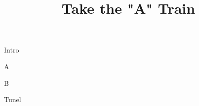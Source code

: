 \documentclass[timestamp]{jazzgrid}
\title{Take the "A" Train}
\begin{document}
\maketitle
\begin{musicsection}{Intro}
\barline
	{\barfour{}
		{}
		{}
		{}
		{}
	}
	{\barfour{}
		{}
		{}
		{}
		{}
	}
	{\barfour{}
		{}
		{}
		{}
		{}
	}
	{\barfour{}
		{}
		{}
		{}
		{}
	}
\end{musicsection}
\begin{musicsection}{A}
\barline
	{\barfour{}
		{}
		{}
		{}
		{}
	}
	{\barfour{}
		{}
		{}
		{}
		{}
	}
	{\barfour{}
		{}
		{}
		{}
		{}
	}
	{\barfour{}
		{}
		{}
		{}
		{}
	}
\barline
	{\barfour{}
		{}
		{}
		{}
		{}
	}
	{\barfour{}
		{}
		{}
		{}
		{}
	}
	{
		{}
		{}
		{}
		{}
	}
	{\barfour{}
		{}
		{}
		{}
		{}
	}
	{
		{}
		{}
		{}
		{}
	}
	{\barfour{}
		{}
		{}
		{}
		{}
	}
	{
		{}
		{}
		{}
		{}
	}
	{\barfour{}
		{}
		{}
		{}
		{}
	}
\end{musicsection}

\begin{musicsection}{B}
\barline
	{\barfour{}
		{}
		{}
		{}
		{}
	}
	{\barfour{}
		{}
		{}
		{}
		{}
	}
	{\barfour{}
		{}
		{}
		{}
		{}
	}
	{\barfour{}
		{}
		{}
		{}
		{}
	}
\barline
	{\barfour{}
		{}
		{}
		{}
		{}
	}
	{\barfour{}
		{}
		{}
		{}
		{}
	}
	{\barfour{}
		{}
		{}
		{}
		{}
	}
	{\barfour{}
		{}
		{}
		{}
		{}
	}
\end{musicsection}

\begin{musicsection}{Tunel}
\barline
	{\barfour{}
		{}
		{}
		{}
		{}
	}
	{\barfour{}
		{}
		{}
		{}
		{}
	}
	{\barfour{}
		{}
		{}
		{}
		{}
	}
	{\barfour{}
		{}
		{}
		{}
		{}
	}
\barline
	{\barfour{}
		{}
		{}
		{}
		{}
	}
	{\barfour{}
		{}
		{}
		{}
		{}
	}
	{
		{}
		{}
		{}
		{}
	}
	{\barfour{}
		{}
		{}
		{}
		{}
	}
	{
		{}
		{}
		{}
		{}
	}
	{\barfour{}
		{}
		{}
		{}
		{}
	}
	{\barfour{}
		{}
		{}
		{}
		{}
	}
\end{musicsection}
\end{document}
